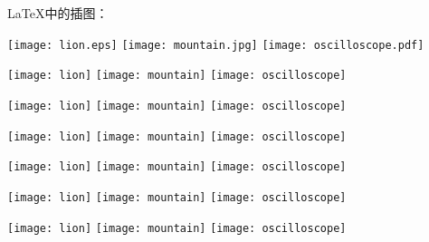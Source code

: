 \documentclass{ctexart}%
\begin{document}
	\LaTeX{}中的插图：
	
	\texttt{[image: lion.eps]}
	\texttt{[image: mountain.jpg]}
	\texttt{[image: oscilloscope.pdf]}
	
	\texttt{[image: lion]}
	\texttt{[image: mountain]}
	\texttt{[image: oscilloscope]}
	
	\texttt{[image: lion]}
	\texttt{[image: mountain]}
	\texttt{[image: oscilloscope]}
	
	\texttt{[image: lion]}
	\texttt{[image: mountain]}
	\texttt{[image: oscilloscope]}	
	
	\texttt{[image: lion]}
	\texttt{[image: mountain]}
	\texttt{[image: oscilloscope]}
	
	\texttt{[image: lion]}
	\texttt{[image: mountain]}
	\texttt{[image: oscilloscope]}
	
	
	\texttt{[image: lion]}
	\texttt{[image: mountain]}
	\texttt{[image: oscilloscope]}
\end{document}
